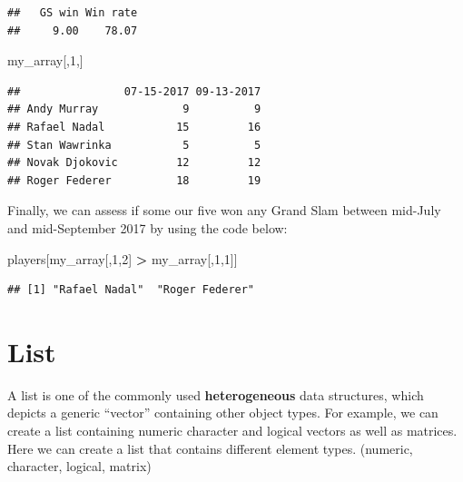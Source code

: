 \documentclass[12pt,]{krantz}
\newenvironment{Shaded}{\begin{snugshade}}{\end{snugshade}}
\newcommand{\DecValTok}[1]{\textcolor[rgb]{0.06,0.06,0.06}{#1}}
\newcommand{\StringTok}[1]{\textcolor[rgb]{0.5,0.5,0.5}{#1}}
\newcommand{\OperatorTok}[1]{\textcolor[rgb]{0.43,0.43,0.43}{\textbf{#1}}}
\newcommand{\NormalTok}[1]{#1}
\begin{document}
\begin{verbatim}
##   GS win Win rate 
##     9.00    78.07
\end{verbatim}

\begin{Shaded}
\begin{Highlighting}[]
\NormalTok{my_array[,}\DecValTok{1}\NormalTok{,]}
\end{Highlighting}
\end{Shaded}

\begin{verbatim}
##                07-15-2017 09-13-2017
## Andy Murray             9          9
## Rafael Nadal           15         16
## Stan Wawrinka           5          5
## Novak Djokovic         12         12
## Roger Federer          18         19
\end{verbatim}

Finally, we can assess if some our five won any Grand Slam between
mid-July and mid-September 2017 by using the code below:

\begin{Shaded}
\begin{Highlighting}[]
\NormalTok{players[my_array[,}\DecValTok{1}\NormalTok{,}\DecValTok{2}\NormalTok{] }\OperatorTok{>}\StringTok{ }\NormalTok{my_array[,}\DecValTok{1}\NormalTok{,}\DecValTok{1}\NormalTok{]]}
\end{Highlighting}
\end{Shaded}

\begin{verbatim}
## [1] "Rafael Nadal"  "Roger Federer"
\end{verbatim}

\section{List}\label{list}

A list is one of the commonly used \textbf{heterogeneous} data
structures, which depicts a generic ``vector'' containing other object
types. For example, we can create a list containing numeric character
and logical vectors as well as matrices. Here we can create a list that
contains different element types. (numeric, character, logical, matrix)
\end{document}
